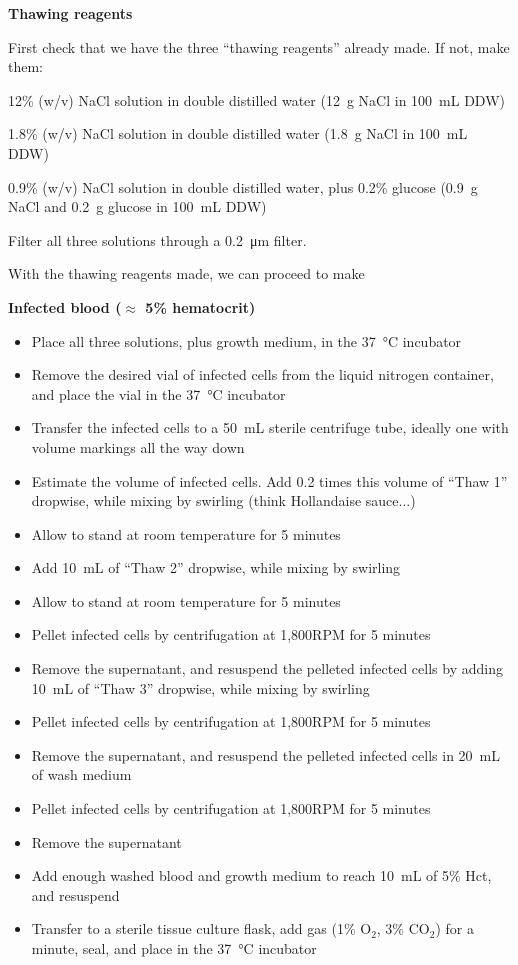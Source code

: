 \documentclass{article}
\begin{document}
\textbf{Thawing reagents}

First check that we have the three ``thawing reagents'' already made. If not, make them:

\begin{description}
	\item[Thaw 1 - ] 12\% (w/v) NaCl solution in double distilled water (\SI{12}{g} NaCl in \SI{100}{mL} DDW)
	\item[Thaw 2 - ] 1.8\% (w/v) NaCl solution in double distilled water (\SI{1.8}{g} NaCl in \SI{100}{mL} DDW)
	\item[Thaw 3 - ] 0.9\% (w/v) NaCl solution in double distilled water, plus 0.2\% glucose (\SI{0.9}{g} NaCl and \SI{0.2}{g} glucose in \SI{100}{mL} DDW)
	\item Filter all three solutions through a \SI{0.2}{\micro\meter} filter.\\
\end{description}

With the thawing reagents made, we can proceed to make

\textbf{Infected blood ($\approx$ 5\% hematocrit)}

\begin{itemize}
	\item Place all three solutions, plus growth medium, in the \SI{37}{\celsius} incubator
	\item Remove the desired vial of infected cells from the liquid nitrogen container, and place the vial in the \SI{37}{\celsius} incubator
	\item Transfer the infected cells to a \SI{50}{mL} sterile centrifuge tube, ideally one with volume markings all the way down
	\item Estimate the volume of infected cells. Add 0.2 times this volume of ``Thaw 1'' dropwise, while mixing by swirling (think Hollandaise sauce...)
	\item Allow to stand at room temperature for 5 minutes
	\item Add \SI{10}{mL} of ``Thaw 2'' dropwise, while mixing by swirling
	\item Allow to stand at room temperature for 5 minutes
	\item Pellet infected cells by centrifugation at 1,800RPM for 5 minutes
	\item Remove the supernatant, and resuspend the pelleted infected cells by adding \SI{10}{mL} of ``Thaw 3'' dropwise, while mixing by swirling
	\item Pellet infected cells by centrifugation at 1,800RPM for 5 minutes
	\item Remove the supernatant, and resuspend the pelleted infected cells in \SI{20}{mL} of wash medium
	\item Pellet infected cells by centrifugation at 1,800RPM for 5 minutes
	\item Remove the supernatant
	\item Add enough washed blood and growth medium to reach \SI{10}{mL} of 5\% Hct, and resuspend
	\item Transfer to a sterile tissue culture flask, add gas (1\% O$_2$, 3\% CO$_2$) for a minute, seal, and place in the \SI{37}{\celsius} incubator
\end{itemize}
\end{document}
